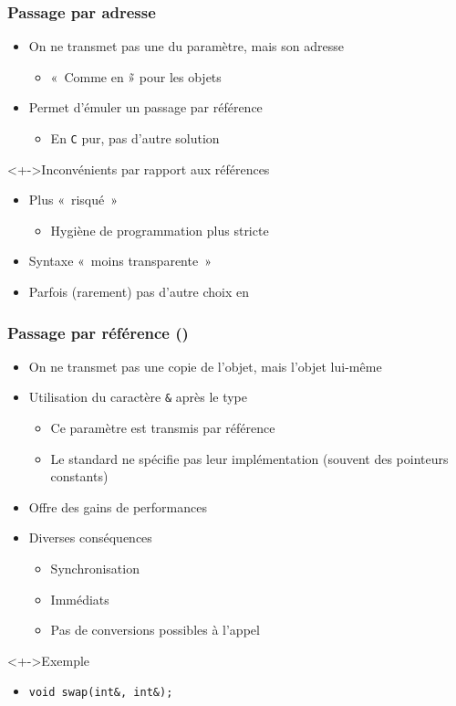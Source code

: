 \begin{frame}
\frametitle{Passage par adresse}
\begin{itemize}[<+->]
\item On ne transmet pas une du paramètre, mais son adresse
	\begin{itemize}
	\item «~Comme en \java\~» pour les objets
	\end{itemize}
\item Permet d'émuler un passage par référence
	\begin{itemize}
	\item En \texttt{C} pur, pas d'autre solution
	\end{itemize}
\end{itemize}
\begin{alertblock}<+->{Inconvénients par rapport aux références}
	\begin{itemize}[<+->]
	\item Plus «~risqué~»
		\begin{itemize}
		\item Hygiène de programmation plus stricte
		\end{itemize}
	\item Syntaxe «~moins transparente~»
	\end{itemize}
\end{alertblock}
\begin{itemize}[<+->]
\item Parfois (rarement) pas d'autre choix en \cpp
\end{itemize}
\end{frame}

\begin{frame}
\frametitle{Passage par référence (\cpp)}
\begin{itemize}[<+->]
\item On ne transmet pas une copie de l'objet, mais l'objet lui-même
\item Utilisation du caractère \texttt{\&} après le type
	\begin{itemize}
	\item Ce paramètre est transmis par référence
   \item Le standard ne spécifie pas leur implémentation (souvent des pointeurs constants)
	\end{itemize}
\item Offre des gains de performances
\item Diverses conséquences
	\begin{itemize}
	\item Synchronisation
	\item Immédiats
	\item Pas de conversions possibles à l'appel
	\end{itemize}
\end{itemize}
\begin{exampleblock}<+->{Exemple}
	\begin{itemize}[<+->]
	\item \lstinline|void swap(int&, int&);|
	\end{itemize}
\end{exampleblock}
\end{frame}

